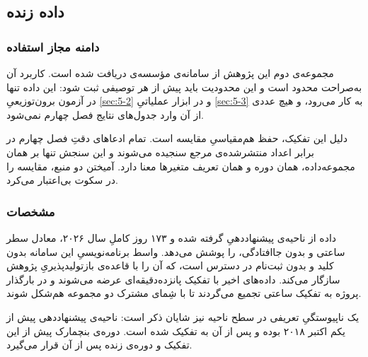 
\subsection{داده زنده }
\label{sec:3-3-2}

\subsubsection*{دامنه مجاز استفاده}

مجموعه‌ی دوم این پژوهش از سامانه‌ی  مؤسسه‌ی 
دریافت شده است. کاربرد آن به‌صراحت محدود است و این محدودیت باید پیش از هر توصیفی
ثبت شود: این داده تنها در آزمون برون‌توزیعیِ \cref{sec:5-2} و در ابزار عملیاتیِ \cref{sec:5-3} به
کار می‌رود، و هیچ عددی از آن وارد جدول‌های نتایج فصل چهارم نمی‌شود.

دلیل این تفکیک، حفظ هم‌مقیاسیِ مقایسه است. تمام ادعاهای دقتِ فصل چهارم در برابر
اعداد منتشرشده‌ی مرجع سنجیده می‌شوند و این سنجش تنها بر همان مجموعه‌داده، همان دوره و
همان تعریف متغیرها معنا دارد. آمیختن دو منبع، مقایسه را در سکوت بی‌اعتبار می‌کرد.

\subsubsection*{مشخصات}

داده از ناحیه‌ی پیشنهاددهیِ  گرفته شده و ۱۷۳ روز کاملِ سال ۲۰۲۶، معادل
 سطر ساعتی و بدون جاافتادگی، را پوشش می‌دهد. واسط برنامه‌نویسیِ این سامانه
بدون کلید و بدون ثبت‌نام در دسترس است، که آن را با قاعده‌ی بازتولیدپذیریِ پژوهش سازگار
می‌کند. داده‌های اخیر با تفکیک پانزده‌دقیقه‌ای عرضه می‌شوند و در بارگذار پروژه به
تفکیک ساعتی تجمیع می‌گردند تا با شِمای مشترک دو مجموعه هم‌شکل شوند.

یک ناپیوستگیِ تعریفی در سطح ناحیه نیز شایان ذکر است: ناحیه‌ی پیشنهاددهی پیش از یکم
اکتبر ۲۰۱۸  بوده و پس از آن به  تفکیک شده است. دوره‌ی بنچمارک
پیش از این تفکیک و دوره‌ی زنده پس از آن قرار می‌گیرد.

